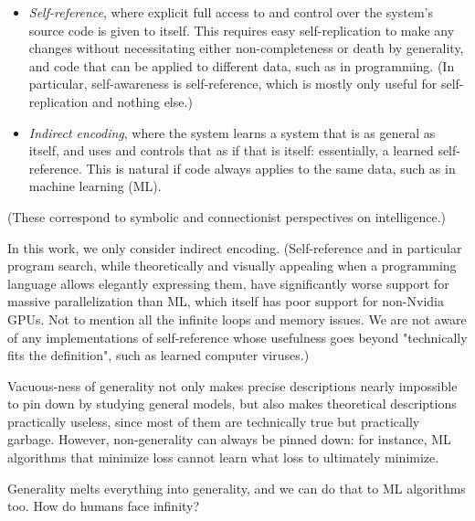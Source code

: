 \documentclass{article}
\begin{document}
\begin{itemize}
\item \textit{Self-reference}, where explicit full access to and control over the system's source code is given to itself. This requires easy self-replication to make any changes without necessitating either non-completeness or death by generality, and code that can be applied to different data, such as in programming. (In particular, self-awareness is self-reference, which is mostly only useful for self-replication and nothing else.)
\item \textit{Indirect encoding}, where the system learns a system that is as general as itself, and uses and controls that as if that is itself: essentially, a learned self-reference. This is natural if code always applies to the same data, such as in machine learning (ML).
\end{itemize}

(These correspond to symbolic and connectionist perspectives on intelligence.)

In this work, we only consider indirect encoding. (Self-reference and in particular program search, while theoretically and visually appealing when a programming language allows elegantly expressing them, have significantly worse support for massive parallelization than ML, which itself has poor support for non-Nvidia GPUs. Not to mention all the infinite loops and memory issues. We are not aware of any implementations of self-reference whose usefulness goes beyond "technically fits the definition", such as learned computer viruses.)

Vacuous-ness of generality not only makes precise descriptions nearly impossible to pin down by studying general models, but also makes theoretical descriptions practically useless, since most of them are technically true but practically garbage. However, non-generality can always be pinned down: for instance, ML algorithms that minimize loss cannot learn what loss to ultimately minimize.

Generality melts everything into generality, and we can do that to ML algorithms too. How do humans face infinity?
\end{document}
